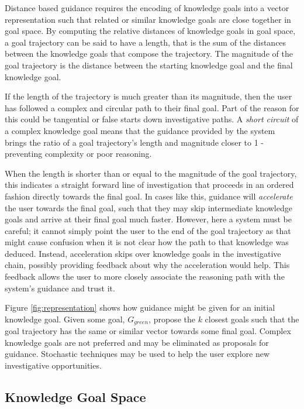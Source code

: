 \documentclass[letterpaper]{article}
\begin{document}
Distance based guidance requires the encoding of knowledge goals into a vector representation such that related or similar knowledge goals are close together in goal space. By computing the relative distances of knowledge goals in goal space, a goal trajectory can be said to have a length, that is the sum of the distances between the knowledge goals that compose the trajectory. The magnitude of the goal trajectory is the distance between the starting knowledge goal and the final knowledge goal.

If the length of the trajectory is much greater than its magnitude, then the user has followed a complex and circular path to their final goal. Part of the reason for this could be tangential or false starts down investigative paths. A \textit{short circuit} of a complex knowledge goal means that the guidance provided by the system brings the ratio of a goal trajectory's length and magnitude closer to 1 - preventing complexity or poor reasoning.

When the length is shorter than or equal to the magnitude of the goal trajectory, this indicates a straight forward line of investigation that proceeds in an ordered fashion directly towards the final goal. In cases like this, guidance will \textit{accelerate} the user towards the final goal, such that they may skip intermediate knowledge goals and arrive at their final goal much faster. However, here a system must be careful; it cannot simply point the user to the end of the goal trajectory as that might cause confusion when it is not clear how the path to that knowledge was deduced. Instead, acceleration skips over knowledge goals in the investigative chain, possibly providing feedback about why the acceleration would help. This feedback allows the user to more closely associate the reasoning path with the system's guidance and trust it.

Figure \ref{fig:representation} shows how guidance might be given for an initial knowledge goal. Given some goal, $G_{green}$, propose the $k$ closest goals such that the goal trajectory has the same or similar vector towards some final goal. Complex knowledge goals are not preferred and may be eliminated as proposals for guidance. Stochastic techniques may be used to help the user explore new investigative opportunities.

\subsection{Knowledge Goal Space}
\end{document}
